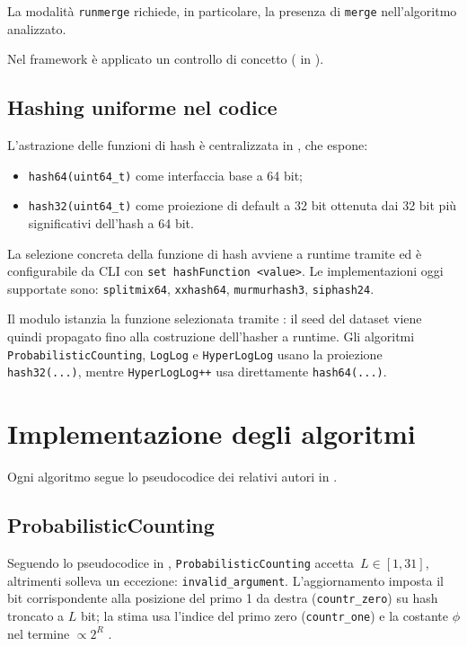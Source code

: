 La modalità \texttt{runmerge} richiede, in particolare, la presenza di
\texttt{merge} nell'algoritmo analizzato.

Nel framework è applicato un controllo di concetto
( in
).

\subsection{Hashing uniforme nel codice}

L'astrazione delle funzioni di hash è centralizzata in
, che espone:
\begin{itemize}
    \item \texttt{hash64(uint64\_t)} come interfaccia base a 64 bit;
    \item \texttt{hash32(uint64\_t)} come proiezione di default a 32 bit
    ottenuta dai 32 bit più significativi dell'hash a 64 bit.
\end{itemize}

La selezione concreta della funzione di hash avviene a runtime tramite
 ed è configurabile da CLI con
\texttt{set hashFunction <value>}. Le implementazioni oggi supportate sono:
\texttt{splitmix64}, \texttt{xxhash64}, \texttt{murmurhash3}, \texttt{siphash24}.

Il modulo  istanzia la funzione selezionata tramite
: il seed
del dataset viene quindi propagato fino alla costruzione dell'hasher a runtime.
Gli algoritmi \texttt{ProbabilisticCounting}, \texttt{LogLog} e \texttt{HyperLogLog}
usano la proiezione \texttt{hash32(...)}, mentre \texttt{HyperLogLog++}
usa direttamente \texttt{hash64(...)}.

\section{Implementazione degli algoritmi}
Ogni algoritmo segue lo pseudocodice dei relativi autori in \cite{Flajolet_Martin_1985,Durand_Flajolet_2003,Flajolet_Fusy_Gandouet_Meunier_2007,Heule_Nunkesser_Hall_2013,Cormode_CountMinSketch_Encyclopedia,Bloom_1970}.
\subsection{ProbabilisticCounting}
Seguendo lo pseudocodice in \cite{Flajolet_Martin_1985}, \texttt{ProbabilisticCounting}
accetta \(\,L \in [1,31]\), altrimenti solleva un eccezione: \texttt{invalid\_argument}.
L'aggiornamento imposta il bit corrispondente alla posizione del primo 1 da
destra (\texttt{countr\_zero}) su hash troncato a \(L\) bit; la stima usa
l'indice del primo zero (\texttt{countr\_one}) e la costante \(\phi\) nel termine
\(\propto 2^R\) \cite{Flajolet_Martin_1985}.


